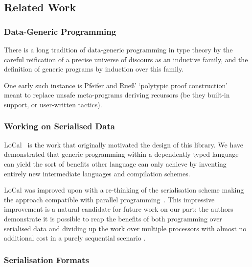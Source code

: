 
\subsection{Related Work}

\subsubsection{Data-Generic Programming}

There is a long tradition of data-generic programming in type theory by
the careful reification of a precise universe of discours as an inductive
family, and the definition of generic programs by induction over this family.

One early such instance is Pfeifer and Rue{\ss}'
`polytypic proof construction'~\cite{DBLP:conf/tphol/PfeiferR99}
meant to replace unsafe meta-programs deriving recursors
(be they built-in support, or user-written tactics).



\cite{DBLP:phd/ethos/Morris07}
\cite{DBLP:conf/icfp/LohM11}

\subsubsection{Working on Serialised Data}

LoCal~\cite{DBLP:conf/pldi/VollmerKRS0N19} is the work that originally
motivated the design of this library.
%
We have demonstrated that generic programming within a dependently typed
language can yield the sort of benefits other language can only achieve
by inventing entirely new intermediate languages and compilation schemes.

LoCal was improved upon with a re-thinking of the serialisation scheme
making the approach compatible with parallel
programming~\cite{DBLP:journals/pacmpl/KoparkarRVKN21}.
This impressive improvement is a natural candidate for future work on our
part: the authors demonstrate it is possible to reap the benefits of
both programming over serialised data
and dividing up the work over multiple processors
with almost no additional cost in a purely sequential scenario .

\subsubsection{Serialisation Formats}


